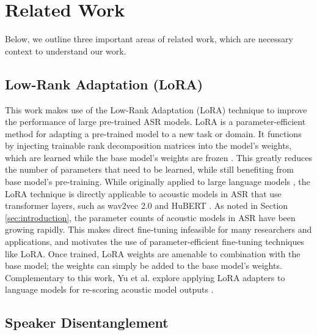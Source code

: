 \section{Related Work}

Below, we outline three important areas of related work, which are necessary context to understand our work.

\subsection{Low-Rank Adaptation (LoRA)}

This work makes use of the Low-Rank Adaptation (LoRA) technique to improve the performance of large pre-trained ASR models.
LoRA \cite{lora} is a parameter-efficient method for adapting a pre-trained model to a new task or domain.
It functions by injecting trainable rank decomposition matrices into the model's weights, which are learned while the base model's weights are frozen \cite{lora}.
This greatly reduces the number of parameters that need to be learned, while still benefiting from base model's pre-training.
While originally applied to large language models \cite{lora}, the LoRA technique is directly applicable to acoustic models in ASR that use transformer \cite{transformer} layers, such as wav2vec 2.0 and HuBERT \cite{wav2vec2, hubert}.
As noted in Section \ref{sec:introduction}, the parameter counts of acoustic models in ASR have been growing rapidly.
This makes direct fine-tuning infeasible for many researchers and applications, and motivates the use of parameter-efficient fine-tuning techniques like LoRA.
Once trained, LoRA weights are amenable to combination with the base model; the weights can simply be added to the base model's weights.
Complementary to this work, Yu et al. explore applying LoRA adapters to language models for re-scoring acoustic model outputs \cite{loraonlm}.

\subsection{Speaker Disentanglement}

